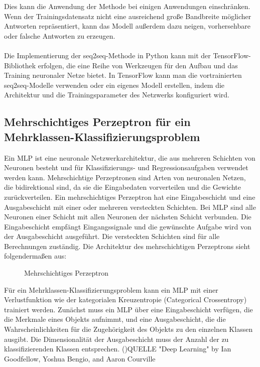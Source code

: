 Dies kann die Anwendung der Methode bei einigen Anwendungen einschränken. 
Wenn der Trainingsdatensatz nicht eine ausreichend große Bandbreite möglicher Antworten repräsentiert, kann das Modell außerdem dazu neigen, vorhersehbare oder falsche Antworten zu erzeugen.\\\\
Die Implementierung der seq2seq-Methode in Python kann mit der TensorFlow-Bibliothek erfolgen, die eine Reihe von Werkzeugen für den Aufbau und das Training neuronaler Netze bietet. 
In TensorFlow kann man die vortrainierten seq2seq-Modelle verwenden oder ein eigenes Modell erstellen, indem die Architektur und die Trainingsparameter des Netzwerks konfiguriert wird. \cite{tensorflow}
\subsection{Mehrschichtiges Perzeptron für ein Mehrklassen-Klassifizierungsproblem}
Ein \ac{MLP} ist eine neuronale Netzwerkarchitektur, die aus mehreren Schichten von Neuronen besteht und für Klassifizierungs- und Regressionsaufgaben verwendet werden kann. 
Mehrschichtige Perzeptronen sind Arten von neuronalen Netzen, die bidirektional sind, da sie die Eingabedaten vorverteilen und die Gewichte zurückverteilen. 
Ein mehrschichtiges Perzeptron hat eine Eingabeschicht und eine Ausgabeschicht mit einer oder mehreren versteckten Schichten. 
Bei \ac{MLP} sind alle Neuronen einer Schicht mit allen Neuronen der nächsten Schicht verbunden. 
Die Eingabeschicht empfängt Eingangssignale und die gewünschte Aufgabe wird von der Ausgabeschicht ausgeführt. 
Die versteckten Schichten sind für alle Berechnungen zuständig. 
Die Architektur des mehrschichtigen Perzeptrons sieht folgendermaßen aus:
\begin{figure}[H]
    \centering
    \caption{\label{figure:Mehrschichtiges_Perzeptron}Mehrschichtiges Perzeptron}
\end{figure}
\noindent
Für ein Mehrklassen-Klassifizierungsproblem kann ein \ac{MLP} mit einer Verlustfunktion wie der kategorialen Kreuzentropie (Categorical Crossentropy) trainiert werden. 
Zunächst muss ein \ac{MLP} über eine Eingabeschicht verfügen, die die Merkmale eines Objekts aufnimmt, und eine Ausgabeschicht, die die Wahrscheinlichkeiten für die Zugehörigkeit des Objekts zu den einzelnen Klassen ausgibt. 
Die Dimensionalität der Ausgabeschicht muss der Anzahl der zu klassifizierenden Klassen entsprechen. ()QUELLE "Deep Learning" by Ian Goodfellow, Yoshua Bengio, and Aaron Courville
